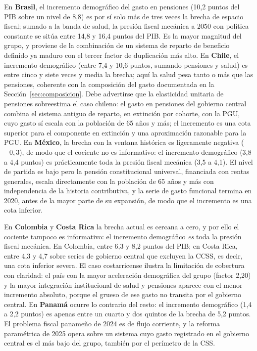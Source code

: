 \documentclass[12pt, letterpaper]{article}
\begin{document}
En \textbf{Brasil}, el incremento demográfico del gasto en pensiones (10,2 puntos
del PIB sobre un nivel de 8,8) es por sí solo más de tres veces la brecha de
espacio fiscal; sumado a la banda de salud, la presión fiscal mecánica a 2050 con
política constante se sitúa entre 14,8 y 16,4 puntos del PIB. Es la mayor magnitud
del grupo, y proviene de la combinación de un sistema de reparto
de beneficio definido ya maduro con el tercer factor de duplicación más alto. En
\textbf{Chile}, el incremento demográfico (entre 7,4 y 10,6 puntos, sumando
pensiones y salud) es entre cinco y siete veces y media la brecha; aquí la salud pesa tanto
o más que las pensiones, coherente con la composición del gasto documentada en la
Sección~\ref{sec:composicion}. Debe advertirse que la elasticidad unitaria de
pensiones sobreestima el caso chileno: el gasto en pensiones del gobierno central
combina el sistema antiguo de reparto, en extinción por cohorte, con la PGU, cuyo
gasto sí escala con la población de 65 años y más; el incremento es una cota
superior para el componente en extinción y una aproximación razonable para la PGU.
En \textbf{México}, la brecha con la ventana histórica es ligeramente negativa
($-0{,}3$), de modo que el cociente no es informativo: el incremento demográfico
(3,8 a 4,4 puntos) es prácticamente toda la presión fiscal mecánica (3,5 a 4,1). El
nivel de partida es bajo pero la pensión
constitucional universal, financiada con rentas generales, escala directamente con
la población de 65 años y más con independencia de la historia contributiva, y la
serie de gasto funcional termina en 2020, antes de la mayor parte de su expansión,
de modo que el incremento es una cota inferior.

En \textbf{Colombia} y \textbf{Costa Rica} la brecha actual es cercana a cero, y
por ello el cociente tampoco es informativo: el incremento demográfico \emph{es} toda
la presión fiscal mecánica. En Colombia, entre 6,3 y 8,2 puntos del PIB; en Costa Rica,
entre 4,3 y 4,7 sobre series de gobierno central que excluyen la CCSS, es decir,
una cota inferior severa. El caso costarricense ilustra la limitación de cobertura
con claridad: el país con la mayor aceleración demográfica del grupo (factor 2,20)
y la mayor integración institucional de salud y pensiones aparece con el menor
incremento absoluto, porque el grueso de ese gasto no transita por el gobierno
central. En \textbf{Panamá} ocurre lo contrario del resto: el incremento
demográfico (1,4 a 2,2 puntos) es apenas entre un cuarto y dos quintos de la brecha
de 5,2 puntos. El problema fiscal panameño de 2024 es de flujo corriente, y la
reforma paramétrica de 2025 opera sobre un sistema cuyo gasto
registrado en el gobierno central es el más bajo del grupo, también por el
perímetro de la CSS.
\end{document}
